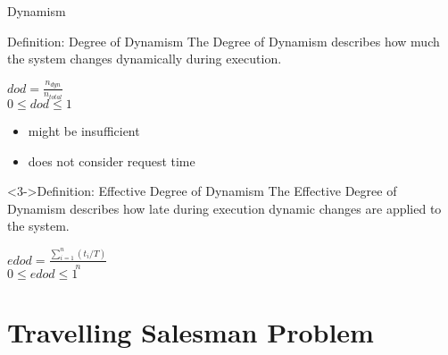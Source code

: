 \documentclass{beamer}
\begin{document}
\begin{frame}{Dynamism}
  \begin{block}{Definition: Degree of Dynamism}
    The \alert{Degree of Dynamism} describes how much the system changes dynamically during execution.

    \begin{center}
      $dod = \frac{n_{dyn}}{n_{total}}$\\
      $0 \le dod \le 1$
    \end{center}

  \end{block}

  \begin{itemize}
    \item<2-> might be insufficient
    \item<2-> does not consider request time
  \end{itemize}

  \begin{block}<3->{Definition: Effective Degree of Dynamism}
    The \alert{Effective Degree of Dynamism} describes how late during execution dynamic changes are applied to the system.

    \begin{center}
      $edod = \frac{\sum_{i=1}^n(t_i/T) }{n}$\\
      $0 \le edod \le 1$
    \end{center}

  \end{block}

\end{frame}



\section[TSP]{Travelling Salesman Problem}

\begin{frame}{}
  \begin{center}
    \structure{\Large \insertsection}
  \end{center}
\end{frame}
\end{document}
